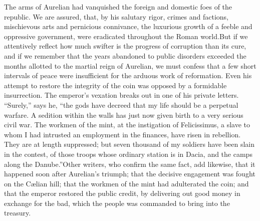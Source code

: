 

The arms of Aurelian had vanquished the foreign and domestic foes
of the republic. We are assured, that, by his salutary rigor,
crimes and factions, mischievous arts and pernicious connivance,
the luxurious growth of a feeble and oppressive government, were
eradicated throughout the Roman world.\footnotemark[87] But if we attentively
reflect how much swifter is the progress of corruption than its
cure, and if we remember that the years abandoned to public
disorders exceeded the months allotted to the martial reign of
Aurelian, we must confess that a few short intervals of peace
were insufficient for the arduous work of reformation. Even his
attempt to restore the integrity of the coin was opposed by a
formidable insurrection. The emperor’s vexation breaks out in one
of his private letters. “Surely,” says he, “the gods have decreed
that my life should be a perpetual warfare. A sedition within the
walls has just now given birth to a very serious civil war. The
workmen of the mint, at the instigation of Felicissimus, a slave
to whom I had intrusted an employment in the finances, have risen
in rebellion. They are at length suppressed; but seven thousand
of my soldiers have been slain in the contest, of those troops
whose ordinary station is in Dacia, and the camps along the
Danube.”\footnotemark[88] Other writers, who confirm the same fact, add
likewise, that it happened soon after Aurelian’s triumph; that
the decisive engagement was fought on the Cælian hill; that the
workmen of the mint had adulterated the coin; and that the
emperor restored the public credit, by delivering out good money
in exchange for the bad, which the people was commanded to bring
into the treasury.\footnotemark[89]




